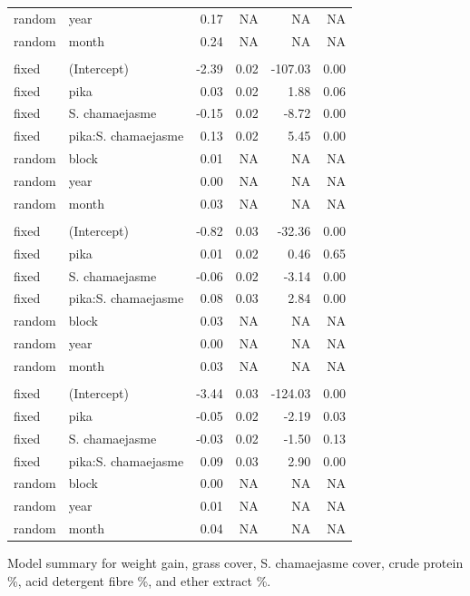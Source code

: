 \documentclass[
  letterpaper,
  DIV=11,
  numbers=noendperiod]{scrartcl}
\begin{document}
\begin{supptbl}
{\begin{table}
\begin{tabular*}{\linewidth}{@{\extracolsep{\fill}}llrrrr}
random & year & 0.17 & NA & NA & NA \\ 
random & month & 0.24 & NA & NA & NA \\ 
\midrule\addlinespace[2.5pt]
\multicolumn{6}{l}{crude protein \%} \\[2.5pt] 
\midrule\addlinespace[2.5pt]
fixed & (Intercept) & -2.39 & 0.02 & -107.03 & 0.00 \\ 
fixed & pika & 0.03 & 0.02 & 1.88 & 0.06 \\ 
fixed & S. chamaejasme & -0.15 & 0.02 & -8.72 & 0.00 \\ 
fixed & pika:S. chamaejasme & 0.13 & 0.02 & 5.45 & 0.00 \\ 
random & block & 0.01 & NA & NA & NA \\ 
random & year & 0.00 & NA & NA & NA \\ 
random & month & 0.03 & NA & NA & NA \\ 
\midrule\addlinespace[2.5pt]
\multicolumn{6}{l}{acid detergent fibre \%} \\[2.5pt] 
\midrule\addlinespace[2.5pt]
fixed & (Intercept) & -0.82 & 0.03 & -32.36 & 0.00 \\ 
fixed & pika & 0.01 & 0.02 & 0.46 & 0.65 \\ 
fixed & S. chamaejasme & -0.06 & 0.02 & -3.14 & 0.00 \\ 
fixed & pika:S. chamaejasme & 0.08 & 0.03 & 2.84 & 0.00 \\ 
random & block & 0.03 & NA & NA & NA \\ 
random & year & 0.00 & NA & NA & NA \\ 
random & month & 0.03 & NA & NA & NA \\ 
\midrule\addlinespace[2.5pt]
\multicolumn{6}{l}{ether extract \%} \\[2.5pt] 
\midrule\addlinespace[2.5pt]
fixed & (Intercept) & -3.44 & 0.03 & -124.03 & 0.00 \\ 
fixed & pika & -0.05 & 0.02 & -2.19 & 0.03 \\ 
fixed & S. chamaejasme & -0.03 & 0.02 & -1.50 & 0.13 \\ 
fixed & pika:S. chamaejasme & 0.09 & 0.03 & 2.90 & 0.00 \\ 
random & block & 0.00 & NA & NA & NA \\ 
random & year & 0.01 & NA & NA & NA \\ 
random & month & 0.04 & NA & NA & NA \\ 
\bottomrule
\end{tabular*}
\end{table}

}

\caption{\label{supptbl-yak-performance-model-summary}Model summary for
weight gain, grass cover, S. chamaejasme cover, crude protein \%, acid
detergent fibre \%, and ether extract \%.}

\end{supptbl}%
\end{document}
